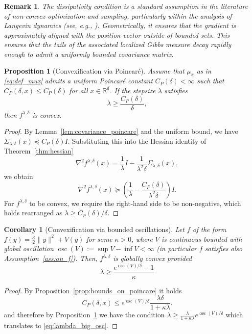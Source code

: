 \documentclass{article}
\newtheorem{proposition}{Proposition}
\newtheorem{corollary}{Corollary}
\newtheorem{remark}{Remark}
\newcommand{\osc}{\ensuremath{\operatorname{osc}}}
\begin{document}
\begin{remark}
    The dissipativity condition is a standard assumption in the literature of non-convex optimization and sampling, particularly within the analysis of Langevin dynamics (see, e.g., \cite{Raginsky2017, XCZG2018}). Geometrically, it ensures that the gradient is approximately aligned with the position vector outside of bounded sets. This ensures that the tails of the associated localized Gibbs measure decay rapidly enough to admit a uniformly bounded covariance matrix.
\end{remark}

\begin{proposition}[Convexification via Poincaré]\label{prop:convexification_via_poincare}
Assume that $\mu_x$ as in \eqref{eq:def_mux} admits a uniform Poincaré constant  $C_P(\delta) < \infty$ such that $C_P(\delta, x) \le C_P(\delta)$ for all $x \in \mathbb{R}^d$. If the stepsize $\lambda$ satisfies
$$ \lambda \geq \frac{C_P(\delta)}{\delta}, $$
then $f^{\lambda,\delta}$ is convex.
\end{proposition}
\begin{proof}
By Lemma~\ref{lem:covariance_poincare} and the uniform bound, we have $\Sigma_{\lambda,\delta}(x) \preceq C_P(\delta) I$. Substituting this into the Hessian identity of Theorem~\ref{thm:hessian}
$$ \nabla^2 f^{\lambda,\delta}(x) = \frac{1}{\lambda}I - \frac{1}{\lambda^2\delta}\Sigma_{\lambda,\delta}(x),$$
we obtain
$$ \nabla^2 f^{\lambda,\delta}(x) \succeq \left( \frac{1}{\lambda} - \frac{C_P(\delta)}{\lambda^2\delta} \right) I. $$
For $f^{\lambda,\delta}$ to be convex, we require the right-hand side to be non-negative, which holds rearranged as $\lambda \ge C_P(\delta) / \delta$.
\end{proof}

\begin{corollary}[Convexification via bounded oscillations]\label{cor:convexification_osc}
Let $f$ of the form $f(y) = \frac{\kappa}{2}\|y\|^2 + V(y)$ for some $\kappa > 0$, where $V$ is continuous bounded with global oscillation $\osc (V) := \sup V - \inf V < \infty$ (in particular $f$ satisfies also Assumption~\ref{ass:on_f}). Then, $f^{\lambda,\delta}$ is globally convex provided
    \begin{equation}\label{eq:lambda_big_osc}
        \lambda \geq \frac{e^{\osc(V)/\delta}-1}{\kappa}
    \end{equation}
    \end{corollary}
\begin{proof} 
By Proposition~\ref{prop:bounds_on_poincare} it holds
\[
C_P(\delta,x)\leq e^{\osc(V)/\delta}
\frac{\lambda\delta}{1+\kappa\lambda}.
\]
and therefore by Proposition~\ref{prop:convexification_via_poincare} we have the condition $\lambda \geq \frac{\lambda}{1+\kappa \lambda}e^{\osc(V)/\delta}$ which translates to \eqref{eq:lambda_big_osc}.
\end{proof}
\end{document}
